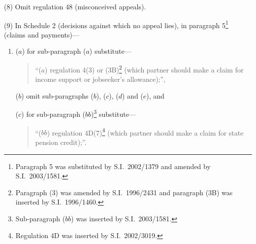 \documentclass[12pt,a4paper]{article}
\begin{document}
%
%
%
%
%
%
%

(8) Omit regulation 48 (misconceived appeals).

(9) In Schedule 2 (decisions against which no appeal lies), in paragraph 5\footnote{Paragraph 5 was substituted by S.I.\ 2002/1379 and amended by S.I.\ 2003/1581.} (claims and payments)—
\begin{enumerate}\item[]
($a$) for sub-paragraph ($a$)  substitute—
\begin{quotation}
“($a$) regulation 4(3) or (3B)\footnote{Paragraph (3) was amended by S.I.\ 1996/2431 and paragraph (3B) was inserted by S.I.\ 1996/1460.} (which partner should make a claim for income support or jobseeker’s allowance);”,
\end{quotation}

($b$) omit sub-paragraphs ($b$), ($c$), ($d$)  and ($e$), and

($c$) for sub-paragraph ($bb$)\footnote{Sub-paragraph ($bb$)  was inserted by S.I.\ 2003/1581.} substitute—
\begin{quotation}
“($bb$) regulation 4D(7)\footnote{Regulation 4D was inserted by S.I.\ 2002/3019.} (which partner should make a claim for state pension credit);”.
\end{quotation}
\end{enumerate}
\end{document}

